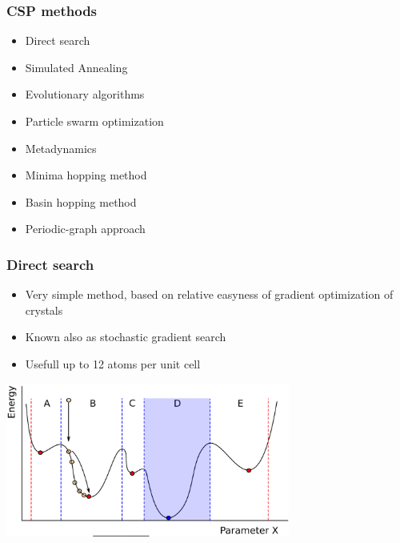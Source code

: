 \documentclass{beamer}
\begin{document}
\begin{frame}
  \frametitle{CSP methods}
  \begin{itemize}
    \item Direct search
    \item Simulated Annealing
    \item Evolutionary algorithms
    \item Particle swarm optimization
    \item Metadynamics
    \item Minima hopping method
    \item Basin hopping method
    \item Periodic-graph approach
  \end{itemize}
\end{frame}

\begin{frame}
  \frametitle{Direct search}
  \begin{itemize}
    \item Very simple method, based on relative easyness of gradient optimization of crystals
    \item Known also as stochastic gradient search
    \item Usefull up to 12 atoms per unit cell
  \end{itemize}
  \centering
  \includegraphics[width=0.7\textwidth]{figs/Priame.png}
\end{frame}
\end{document}

